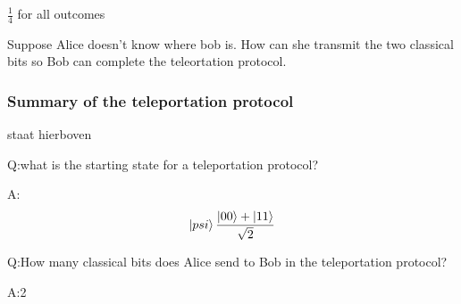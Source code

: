 \documentclass[../../main.tex]{subfiles}
\begin{document}
$\tfrac{1}{4}$ for all outcomes

Suppose Alice doesn't know where bob is. How can she transmit the two classical bits so Bob can complete the teleortation protocol.

\subsubsection*{Summary of the teleportation protocol}
staat hierboven 

Q:what is the starting state for a teleportation protocol?

A:$$\ket{\\psi}\frac{\ket{00}+\ket{11}}{\sqrt{2}}$$

Q:How many classical bits does Alice send to Bob in the teleportation protocol?

A:2
\end{document}
